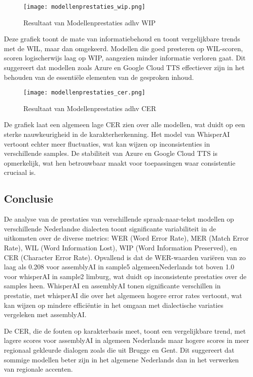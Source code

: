 \begin{figure}[h]
    \centering
    \texttt{[image: modellenprestaties\_wip.png]}
    \captionsetup{justification=centering}
    \caption{Resultaat van Modellenprestaties adhv WIP}
    \label{fig:modellenprestaties_mer}
\end{figure}
\FloatBarrier
Deze grafiek toont de mate van informatiebehoud en toont vergelijkbare trends met de WIL, maar dan omgekeerd. Modellen die goed presteren op WIL-scoren, scoren logischerwijs laag op WIP, aangezien minder informatie verloren gaat. Dit suggereert dat modellen zoals Azure en Google Cloud TTS effectiever zijn in het behouden van de essentiële elementen van de gesproken inhoud.

\begin{figure}[h]
    \centering
    \texttt{[image: modellenprestaties\_cer.png]}
    \captionsetup{justification=centering}
    \caption{Resultaat van Modellenprestaties adhv CER}
    \label{fig:modellenprestaties_mer}
\end{figure}
\FloatBarrier
De grafiek laat een algemeen lage CER zien over alle modellen, wat duidt op een sterke nauwkeurigheid in de karakterherkenning. Het model van WhisperAI vertoont echter meer fluctuaties, wat kan wijzen op inconsistenties in verschillende samples. De stabiliteit van Azure en Google Cloud TTS is opmerkelijk, wat hen betrouwbaar maakt voor toepassingen waar consistentie cruciaal is.

\subsection{Conclusie}

De analyse van de prestaties van verschillende spraak-naar-tekst modellen op verschillende Nederlandse dialecten toont significante variabiliteit in de uitkomsten over de diverse metrics: WER (Word Error Rate), MER (Match Error Rate), WIL (Word Information Lost), WIP (Word Information Preserved), en CER (Character Error Rate). Opvallend is dat de WER-waarden variëren van zo laag als 0.208 voor assemblyAI in sample5 algemeenNederlands tot boven 1.0 voor whisperAI in sample2 limburg, wat duidt op inconsistente prestaties over de samples heen. WhisperAI en assemblyAI tonen significante verschillen in prestatie, met whisperAI die over het algemeen hogere error rates vertoont, wat kan wijzen op mindere efficiëntie in het omgaan met dialectische variaties vergeleken met assemblyAI.

De CER, die de fouten op karakterbasis meet, toont een vergelijkbare trend, met lagere scores voor assemblyAI in algemeen Nederlands maar hogere scores in meer regionaal gekleurde dialogen zoals die uit Brugge en Gent. Dit suggereert dat sommige modellen beter zijn in het algemene Nederlands dan in het verwerken van regionale accenten.

